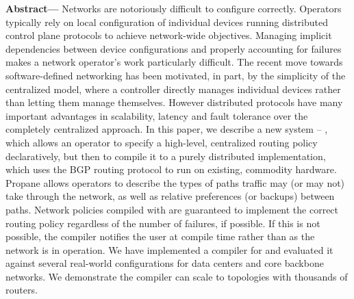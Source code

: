 \textbf{Abstract---}
Networks are notoriously difficult to configure correctly. 
Operators typically rely on local configuration of individual devices running 
distributed control plane protocols to achieve network-wide objectives. 
Managing implicit dependencies between device configurations and properly accounting for failures makes 
a network operator's work particularly difficult. 
%
The recent move towards software-defined networking has been motivated, in part, 
by the simplicity of the centralized model, where a controller directly manages 
individual devices rather than letting them manage themselves. However distributed 
protocols have many important advantages in scalability,
latency and fault tolerance over the completely centralized approach.
%
In this paper, we describe a new system -- \sysname, which allows an operator to specify a high-level, 
centralized routing policy declaratively, but then to compile it to a purely distributed 
implementation, which uses the BGP routing protocol to run on existing, commodity hardware. 
%
Propane allows operators to describe the types of paths traffic may (or may not) take 
through the network, as well as relative preferences (or backups) between paths. 
%
Network policies compiled with \sysname are guaranteed to implement the correct routing policy regardless of the number of failures, if possible.  If this is not possible, the compiler notifies the user at compile time rather than as the network is in 
operation.
%
%
We have implemented a compiler for \sysname and evaluated it against several real-world configurations for data centers and core backbone networks. We demonstrate the \sysname compiler can scale to 
topologies with thousands of routers.
